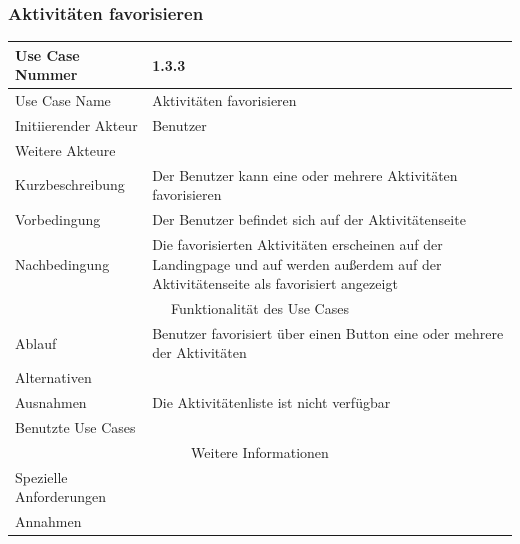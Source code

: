 \documentclass[10pt,a4paper]{article}
\begin{document}
	\subsubsection{Aktivit\"aten favorisieren}
	\begin{tabular}{|l|p{.5\linewidth}|}
	\hline Use Case Nummer & 1.3.3 \\ 
	\hline Use Case Name & Aktivit\"aten favorisieren \\ 
	\hline Initiierender Akteur & Benutzer \\
	\hline Weitere Akteure & \\
	\hline Kurzbeschreibung & Der Benutzer kann eine oder mehrere Aktivit\"aten favorisieren \\
	\hline Vorbedingung & Der Benutzer befindet sich auf der Aktivit\"atenseite \\
	\hline Nachbedingung & Die favorisierten Aktivit\"aten erscheinen auf der Landingpage und auf werden außerdem auf der Aktivit\"atenseite als favorisiert angezeigt \\
	\hline \multicolumn{2}{|c|}{Funktionalität des Use Cases}\\
	\hline Ablauf & Benutzer favorisiert über einen Button eine oder mehrere der Aktivit\"aten \\
	\hline Alternativen & \\
	\hline Ausnahmen & Die Aktivit\"atenliste ist nicht verf\"ugbar \\
	\hline Benutzte Use Cases & \\
	\hline \multicolumn{2}{|c|}{Weitere Informationen} \\
	\hline Spezielle Anforderungen & \\
	\hline Annahmen & \\
	\hline
	\end{tabular} 
\end{document}
